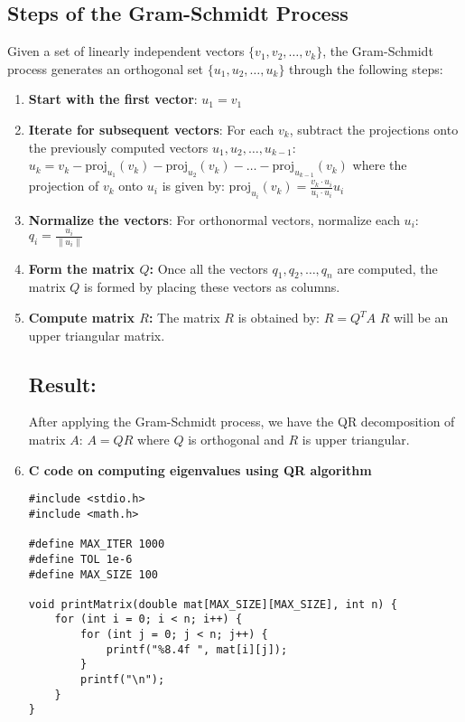 \documentclass[journal]{IEEEtran}
\begin{document}
\subsection{Steps of the Gram-Schmidt Process}
Given a set of linearly independent vectors $ \{v_1, v_2, \dots, v_k\} $, the Gram-Schmidt process generates an orthogonal set $ \{u_1, u_2, \dots, u_k\} $ through the following steps:

\begin{enumerate}
    \item \textbf{Start with the first vector}:
    $
    u_1 = v_1
    $
    
    \item \textbf{Iterate for subsequent vectors}:
    For each $ v_k $, subtract the projections onto the previously computed vectors $ u_1, u_2, \dots, u_{k-1} $:
    $
    u_k = v_k - \text{proj}_{u_1}(v_k) - \text{proj}_{u_2}(v_k) - \dots - \text{proj}_{u_{k-1}}(v_k)
    $
    where the projection of \( v_k \) onto \( u_i \) is given by:
    $
    \text{proj}_{u_i}(v_k) = \frac{v_k \cdot u_i}{u_i \cdot u_i} u_i
    $
    
    \item \textbf{Normalize the vectors}:
    For orthonormal vectors, normalize each $ u_i $:
    $
    q_i = \frac{u_i}{\|u_i\|}
    $
    \item \textbf{Form the matrix $ Q $:} Once all the vectors $ q_1, q_2, \dots, q_n $ are computed, the matrix $ Q $ is formed by placing these vectors as columns.
    
    \item \textbf{Compute matrix $ R $:} The matrix $ R $ is obtained by:
    $
    R = Q^T A
    $
    $ R $ will be an upper triangular matrix.

\subsection{Result:}
After applying the Gram-Schmidt process, we have the QR decomposition of matrix $ A $:
$
A = QR
$
where $ Q $ is orthogonal and $ R $ is upper triangular.
\item \textbf{C code on computing eigenvalues using QR algorithm}
\begin{lstlisting}
#include <stdio.h>
#include <math.h>

#define MAX_ITER 1000
#define TOL 1e-6
#define MAX_SIZE 100

void printMatrix(double mat[MAX_SIZE][MAX_SIZE], int n) {
    for (int i = 0; i < n; i++) {
        for (int j = 0; j < n; j++) {
            printf("%8.4f ", mat[i][j]);
        }
        printf("\n");
    }
}


\end{lstlisting}
\end{enumerate}
\end{document}
